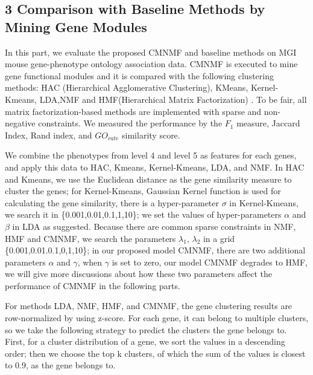\documentclass{bmcart}
\begin{document}

\subsection*{\textbf{3 Comparison with Baseline Methods by Mining Gene Modules}}
In this part, we evaluate the proposed CMNMF and baseline methods on MGI mouse gene-phenotype ontology association data.
CMNMF is executed to mine gene functional modules and it is compared with the following clustering methods: HAC (Hierarchical Agglomerative Clustering)\cite{Ward1963}, KMeans, Kernel-Kmeans\cite{Dhillon2004}, LDA\cite{Blei2003},NMF\cite{Mika1999} and HMF(Hierarchical Matrix Factorization) \cite{AliMashhoori2012}. To be fair, all matrix factorization-based methods are implemented with sparse and non-negative constraints. We measured the performance by the $F_1$ measure, Jaccard Index, Rand index, and $GO_{rate}$ similarity score.

We combine the phenotypes from level 4 and level 5 as features for each genes, and apply this data to HAC, Kmeans, Kernel-Kmeans, LDA, and NMF. In HAC and Kmeans, we use the Euclidean distance as the gene similarity measure to cluster the genes; for Kernel-Kmeans, Gaussian Kernel function is used for calculating the gene similarity, there is a hyper-parameter $\sigma$ in Kernel-Kmeans, we search it in \{0.001,0.01,0.1,1,10\}; we set the values of hyper-parameters $\alpha$ and $\beta$ in LDA as \cite{Wei2006} suggested. Because there are common sparse constraints in NMF, HMF and CMNMF, we search the parameters $\lambda_1$, $\lambda_2$ in a grid \{0.001,0.01.0.1,0,1,10\}; in our proposed model CMNMF, there are two additional parameters $\alpha$ and $\gamma$, when $\gamma$ is set to zero, our model CMNMF degrades to HMF, we will give more discussions about how these two parameters affect the performance of CMNMF in the following parts.

For methods LDA, NMF, HMF, and CMNMF, the gene clustering results are row-normalized by using z-score. For each gene, it can belong to multiple clusters, so we take the following strategy to predict the clusters the gene belongs to. First, for a cluster distribution of a gene, we sort the values in a descending order; then we choose the top k clusters, of which the sum of the values is closest to 0.9, as the gene belongs to.
\end{document}
